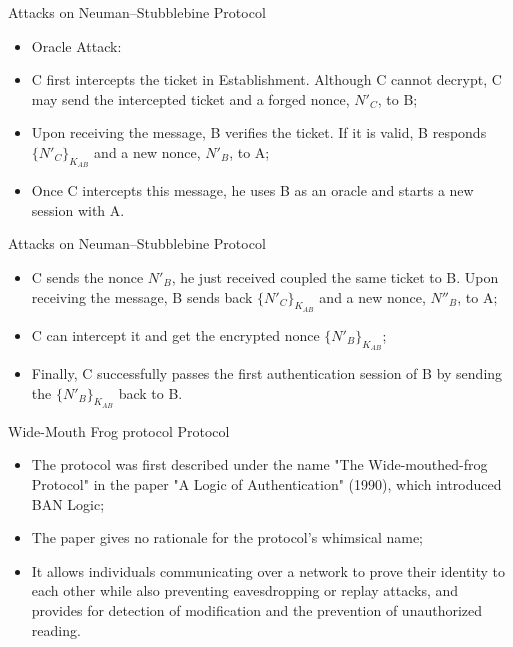 \documentclass[12pt,table,xcolor={dvipsnames}]{beamer}
\begin{document}
\begin{frame}{Attacks on Neuman–Stubblebine Protocol}
\begin{itemize}
\item Oracle Attack:
\item C first intercepts the ticket in Establishment. Although C cannot decrypt, C may send the intercepted ticket and a forged nonce, $N'_{C}$, to B;\pause
\item Upon receiving the message, B verifies the ticket. If it is valid, B responds $\{N'_{C}\}_{K_{AB}}$ and a new nonce, $N'_{B}$, to A;\pause
\item Once C intercepts this message, he uses B as an oracle and starts a new session with A.
\end{itemize}
\end{frame}

\begin{frame}{Attacks on Neuman–Stubblebine Protocol}
\begin{itemize}
\item C sends the nonce $N'_{B}$, he just received coupled the same ticket to B. Upon receiving the message, B sends back $\{N'_{C}\}_{K_{AB}}$ and a new nonce, $N''_{B}$, to A;\pause
\item C can intercept it and get the encrypted nonce $\{N'_{B}\}_{K_{AB}}$;\pause
\item Finally, C successfully passes the first authentication session of B by sending the $\{N'_{B}\}_{K_{AB}}$ back to B.
\end{itemize}
\end{frame}

\begin{frame}{Wide-Mouth Frog protocol Protocol}
\begin{itemize}
\item The protocol was first described under the name "The Wide-mouthed-frog Protocol" in the paper "A Logic of Authentication" (1990), which introduced BAN Logic;\pause
\item The paper gives no rationale for the protocol's whimsical name;\pause
\item It allows individuals communicating over a network to prove their identity to each other while also preventing eavesdropping or replay attacks, and provides for detection of modification and the prevention of unauthorized reading.
\end{itemize}
\end{frame}
\end{document}

